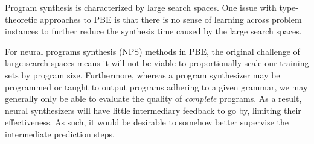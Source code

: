 \documentclass{article} %
\begin{document}



%
Program synthesis is %
characterized by large search spaces.
%
%
One issue with type-theoretic approaches to PBE is that
there is no sense of learning across problem instances to further reduce the synthesis time caused by the large search spaces.


For neural programs synthesis (NPS) methods in PBE, the original challenge of large search spaces means
it will not be viable to proportionally scale our training sets by program size.
%
Furthermore, whereas a program synthesizer may be programmed or taught to output programs adhering to a given grammar,
we may generally only be able to evaluate the quality of \emph{complete} programs.
As a result, neural synthesizers will have little intermediary feedback to go by, limiting their effectiveness.
%
As such, it would be desirable to somehow better supervise the intermediate prediction steps.
\end{document}
